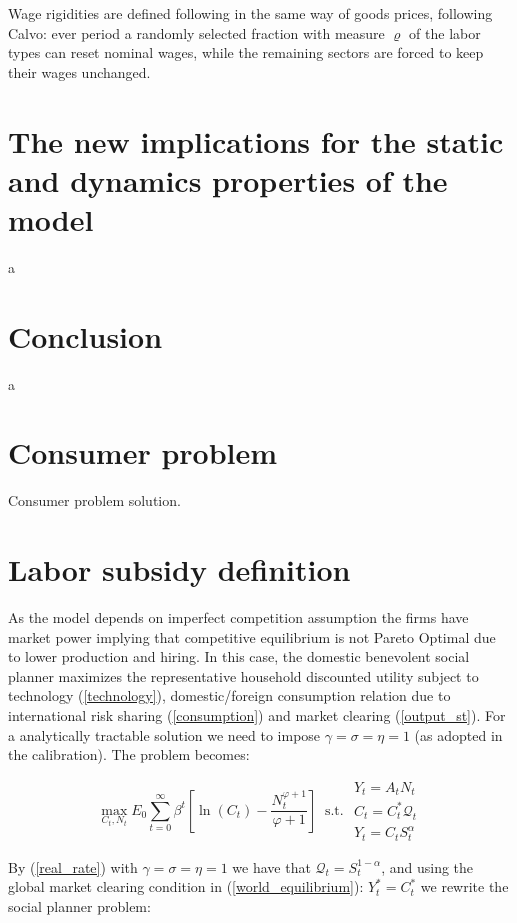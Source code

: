\documentclass{article}
\begin{document}
Wage rigidities are defined following in the same way of goods prices, following Calvo: ever period a randomly selected fraction with measure $\varrho$ of the labor types can reset nominal wages, while the remaining sectors are forced to keep their wages unchanged.



\section{The new implications for the static and dynamics properties of the model}
a


\section{Conclusion}
a



\appendix
\section{Consumer problem}
Consumer problem solution.

\section{Labor subsidy definition}
As the model depends on imperfect competition assumption the firms have market power implying that competitive equilibrium is not Pareto Optimal due to lower production and hiring. In this case, the domestic benevolent social planner maximizes the representative household discounted utility subject to technology (\ref{technology}), domestic/foreign consumption relation due to international risk sharing (\ref{consumption}) and market clearing (\ref{output_st}). For a analytically tractable solution we need to impose $\gamma = \sigma = \eta = 1$ (as adopted in the calibration). The problem becomes:

$$\max_{C_t, N_t} E_0 \sum^\infty_{t=0} \beta^t \left[\ln(C_t) - \frac{N_t^{\varphi+1}}{\varphi+1} \right] \ \textrm{ s.t. } \begin{matrix}
    Y_t = A_t N_t\\
    C_t = C_t^* \mathcal Q_{t}\\
    Y_t = C_t S_t^\alpha
\end{matrix}$$

By (\ref{real_rate}) with $\gamma = \sigma = \eta = 1$ we have that $\mathcal{Q}_t = S_t^{1-\alpha}$, and using the global market clearing condition in (\ref{world_equilibrium}): $Y_t^* = C_t^*$ we rewrite the social planner problem:
\end{document}
